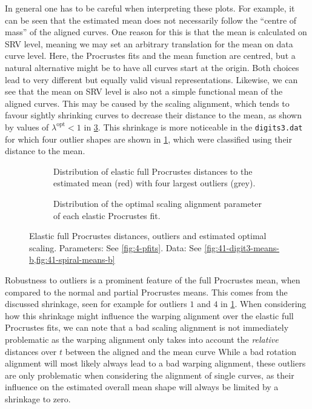 In general one has to be careful when interpreting these plots.
For example, it can be seen that the estimated mean does not necessarily follow the \enquote{centre of mass} of the aligned curves. 
One reason for this is that the mean is calculated on SRV level, meaning we may set an arbitrary translation for the mean on data curve level.
Here, the Procrustes fits and the mean function are centred, but a natural alternative might be to have all curves start at the origin.
Both choices lead to very different but equally valid visual representations.
Likewise, we can see that the mean on SRV level is also not a simple functional mean of the aligned curves.
This may be caused by the scaling alignment, which tends to favour sightly shrinking curves to decrease their distance to the mean, as shown by values of $\lambda^\mathrm{opt} < 1$ in \cref{fig:4-bopts}.
This shrinkage is more noticeable in the \texttt{digits3.dat} for which four outlier shapes are shown in \cref{fig:4-outliers}, which were classified using their distance to the mean. 
\begin{figure}
  \centering
  \begin{subfigure}[t]{0.59\textwidth}
    \begin{subfigure}[t]{0.40\textwidth}
      \centering
    \end{subfigure}
    \begin{subfigure}[t]{0.60\textwidth}
      \centering
    \end{subfigure}
    \caption{Distribution of elastic full Procrustes distances to the estimated mean (red) with four largest outliers (grey).}
  \label{fig:4-outliers}
  \end{subfigure}
  \begin{subfigure}[t]{0.39\textwidth}
    \centering
    \caption{Distribution of the optimal scaling alignment parameter of each elastic Procrustes fit.}
    \label{fig:4-bopts}
  \end{subfigure}
  \caption{Elastic full Procrustes distances, outliers and estimated optimal scaling. Parameters: See \cref{fig:4-pfits}. 
  Data: See \cref{fig:41-digit3-means-b,fig:41-spiral-means-b}}
\end{figure}
Robustness to outliers is a prominent feature of the full Procrustes mean, when compared to the normal and partial Procrustes means.
This comes from the discussed shrinkage, seen for example for outliers $1$ and $4$ in \cref{fig:4-outliers}.
When considering how this shrinkage might influence the warping alignment over the elastic full Procrustes fits, we can note that a bad scaling alignment is not immediately problematic as the warping alignment only takes into account the \emph{relative} distances over $t$ between the aligned and the mean curve
While a bad rotation alignment will most likely always lead to a bad warping alignment, these outliers are only problematic when considering the alignment of single curves, as their influence on the estimated overall mean shape will always be limited by a shrinkage to zero.


